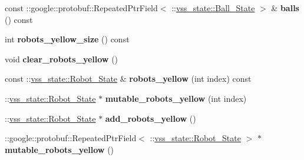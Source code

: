 \begin{DoxyCompactItemize}
\item 
const \+::google\+::protobuf\+::\+Repeated\+Ptr\+Field$<$ \+::\hyperlink{classvss__state_1_1Ball__State}{vss\+\_\+state\+::\+Ball\+\_\+\+State} $>$ \& {\bfseries balls} () const \hypertarget{classvss__state_1_1Global__State_a792da3990e724f225e585f3e099eab3c}{}\label{classvss__state_1_1Global__State_a792da3990e724f225e585f3e099eab3c}

\item 
int {\bfseries robots\+\_\+yellow\+\_\+size} () const \hypertarget{classvss__state_1_1Global__State_ad9605aa1df1cc1a30adc6a88bd85f34f}{}\label{classvss__state_1_1Global__State_ad9605aa1df1cc1a30adc6a88bd85f34f}

\item 
void {\bfseries clear\+\_\+robots\+\_\+yellow} ()\hypertarget{classvss__state_1_1Global__State_a5519565ece84f3f429aa692217fff1f6}{}\label{classvss__state_1_1Global__State_a5519565ece84f3f429aa692217fff1f6}

\item 
const \+::\hyperlink{classvss__state_1_1Robot__State}{vss\+\_\+state\+::\+Robot\+\_\+\+State} \& {\bfseries robots\+\_\+yellow} (int index) const \hypertarget{classvss__state_1_1Global__State_a311a39a8f7be0721ebb684b9bc286ce2}{}\label{classvss__state_1_1Global__State_a311a39a8f7be0721ebb684b9bc286ce2}

\item 
\+::\hyperlink{classvss__state_1_1Robot__State}{vss\+\_\+state\+::\+Robot\+\_\+\+State} $\ast$ {\bfseries mutable\+\_\+robots\+\_\+yellow} (int index)\hypertarget{classvss__state_1_1Global__State_a040f90d8bad2e783b1e91077a7c79234}{}\label{classvss__state_1_1Global__State_a040f90d8bad2e783b1e91077a7c79234}

\item 
\+::\hyperlink{classvss__state_1_1Robot__State}{vss\+\_\+state\+::\+Robot\+\_\+\+State} $\ast$ {\bfseries add\+\_\+robots\+\_\+yellow} ()\hypertarget{classvss__state_1_1Global__State_aecf340a8be8a26db65bd29ebafcbf1d6}{}\label{classvss__state_1_1Global__State_aecf340a8be8a26db65bd29ebafcbf1d6}

\item 
\+::google\+::protobuf\+::\+Repeated\+Ptr\+Field$<$ \+::\hyperlink{classvss__state_1_1Robot__State}{vss\+\_\+state\+::\+Robot\+\_\+\+State} $>$ $\ast$ {\bfseries mutable\+\_\+robots\+\_\+yellow} ()\hypertarget{classvss__state_1_1Global__State_a533514002331b04a673326f334a3e5ce}{}\label{classvss__state_1_1Global__State_a533514002331b04a673326f334a3e5ce}


\end{DoxyCompactItemize}
